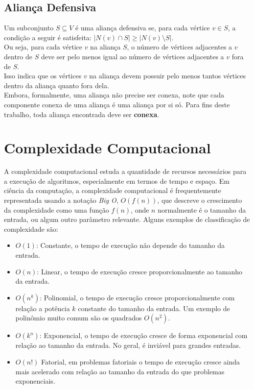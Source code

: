 \subsection{Aliança Defensiva}
Um subconjunto $S \subseteq V$ é uma aliança defensiva se, para cada vértice $v \in S$, a condição a seguir é satisfeita:   $|N(v) \cap S| \geq |N(v) \setminus S|$.\\
Ou seja, para cada vértice $v$ na aliança $S$, o número de vértices adjacentes a $v$ dentro de $S$ deve ser pelo menos igual ao número de vértices adjacentes a $v$ fora de $S$.\\
Isso indica que os vértices $v$ na aliança devem possuir pelo menos tantos vértices dentro da aliança quanto fora dela.\\
Embora, formalmente, uma aliança não precise ser conexa, note que cada componente conexa de uma aliança é uma aliança por si só. Para fins deste trabalho, toda aliança encontrada deve ser \textbf{conexa}.

\section{Complexidade Computacional}
A complexidade computacional estuda a quantidade de recursos necessários para a execução de algoritmos, especialmente em termos de tempo e espaço. Em ciência da computação, a complexidade computacional é frequentemente representada usando a notação \textit{Big O}, $O(f(n))$, que descreve o crescimento da complexidade como uma função $f(n)$, onde $n$ normalmente é o tamanho da entrada, ou algum outro parâmetro relevante. Alguns exemplos de classificação de complexidade são:

\begin{itemize}
  \item $O(1)$: Constante, o tempo de execução não depende do tamanho da entrada.
  \item $O(n)$: Linear, o tempo de execução cresce proporcionalmente ao tamanho da entrada.
  \item $O(n^k)$: Polinomial, o tempo de execução cresce proporcionalmente com relação a potência $k$ constante do tamanho da entrada. Um exemplo de polinômio muito comum são os quadrados $O(n^2)$.
  \item $O(k^n)$: Exponencial, o tempo de execução cresce de forma exponencial com relação ao tamanho da entrada. No geral, é inviável para grandes entradas.
  \item $O(n!)$ Fatorial, em problemas fatoriais o tempo de execução cresce ainda mais acelerado com relação ao tamanho da entrada do que problemas exponenciais.
\end{itemize}

